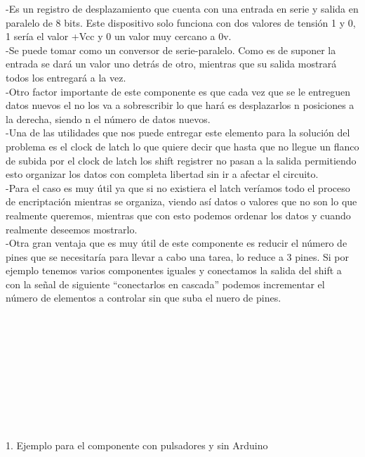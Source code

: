 \documentclass{article}
\begin{document}
-Es un registro de desplazamiento que cuenta con una entrada en serie y salida en paralelo de 8 bits. Este dispositivo solo funciona con dos valores de tensión 1 y 0, 1 sería el valor +Vcc y 0 un valor muy cercano a 0v.\\

-Se puede tomar como un conversor de serie-paralelo. Como es de suponer la entrada se dará un valor uno detrás de otro, mientras que su salida mostrará todos los entregará a la vez.\\

-Otro factor importante de este componente es que cada vez que se le entreguen datos nuevos el no los va a sobrescribir lo que hará es desplazarlos n posiciones a la derecha, siendo n el número de datos nuevos.\\

-Una de las utilidades que nos puede entregar este elemento para la solución del problema es el clock de latch lo que quiere decir que hasta que no llegue un flanco de subida por el clock de latch los shift registrer no pasan a la salida permitiendo esto organizar los datos con completa libertad sin ir a afectar el circuito.\\

-Para el caso es muy útil ya que si no existiera el latch veríamos todo el proceso de encriptación mientras se organiza, viendo así datos o valores que no son lo que realmente queremos, mientras que con esto podemos ordenar los datos y cuando realmente deseemos mostrarlo.\\

-Otra gran ventaja que es muy útil de este componente es reducir el número de pines que se necesitaría para llevar a cabo una tarea, lo reduce a 3 pines. Si por ejemplo tenemos varios componentes iguales y conectamos la salida del shift a con la señal de siguiente “conectarlos en cascada” podemos incrementar el número de elementos a controlar sin que suba el nuero de pines.\\
\\
\\
\\
\\
\\
\\
\\
\\
\\
\item 1. Ejemplo para el componente con pulsadores y sin Arduino\\
\end{document}
